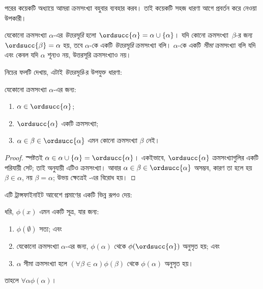 \documentclass[../../../include/open-logic-section]{subfiles}
\begin{document}

পরের কয়েকটি অধ্যায়ে আমরা ক্রমসংখ্যা বহুবার ব্যবহার
করব। তাই কয়েকটি সহজ ধারণা আগে প্রবর্তন করে নেওয়া
উপকারী।

\begin{defn}
যেকোনো ক্রমসংখ্যা $\alpha$-এর \emph{উত্তরসূরি} হলো $\ordsucc{\alpha}
=\alpha \cup \{\alpha\}$। যদি কোনো ক্রমসংখ্যা~$\beta$-র
জন্য $\ordsucc{\beta} = \alpha$ হয়, তবে $\alpha$-কে
একটি \emph{উত্তরসূরি} ক্রমসংখ্যা বলি। $\alpha$-কে
একটি \emph{সীমা} ক্রমসংখ্যা বলি যদি এবং কেবল যদি
$\alpha$ শূন্যও নয়, উত্তরসূরি ক্রমসংখ্যাও নয়।
\end{defn}
\noindent
নিচের ফলটি দেখায়, এটাই \emph{উত্তরসূরি}-র উপযুক্ত ধারণা:

\begin{prop}
যেকোনো ক্রমসংখ্যা $\alpha$-এর জন্য:
\begin{enumerate}
	\item $\alpha \in \ordsucc{\alpha}$;
	\item $\ordsucc{\alpha}$ একটি ক্রমসংখ্যা;
	\item $\alpha \in \beta \in
	\ordsucc{\alpha}$ এমন কোনো ক্রমসংখ্যা $\beta$ নেই।
	\end{enumerate}
\end{prop}

\begin{proof}
স্পষ্টতই $\alpha \in \alpha \cup \{\alpha\} = \ordsucc{\alpha}$।
একইভাবে, $\ordsucc{\alpha}$ ক্রমসংখ্যাগুলির একটি
পরিযায়ী সেট; তাই 
অনুযায়ী এটিও ক্রমসংখ্যা। আবার $\alpha \in \beta
\in \ordsucc{\alpha}$ অসম্ভব, কারণ তা হলে হয়
$\beta \in \alpha$, নয় $\beta = \alpha$;
উভয় ক্ষেত্রেই -এর বিরোধ হয়।
\end{proof}
\noindent
এটি ট্রান্সফাইনাইট আবেশে প্রমাণের একটি ভিন্ন রূপও দেয়:

\begin{thm}[সরল ট্রান্সফাইনাইট আবেশ]
ধরি, $\phi(x)$ এমন একটি সূত্র, যার জন্য:
\begin{enumerate}
	\item $\phi(\emptyset)$ সত্য; এবং
	\item যেকোনো ক্রমসংখ্যা $\alpha$-এর জন্য, $\phi(\alpha)$
	থেকে $\phi(\ordsucc{\alpha})$ অনুসৃত হয়; এবং
	\item $\alpha$ সীমা ক্রমসংখ্যা হলে $(\forall \beta \in
	\alpha)\phi(\beta)$ থেকে $\phi(\alpha)$ অনুসৃত হয়।
\end{enumerate}
তাহলে $\forall \alpha \phi(\alpha)$।
\end{thm}
\end{document}
